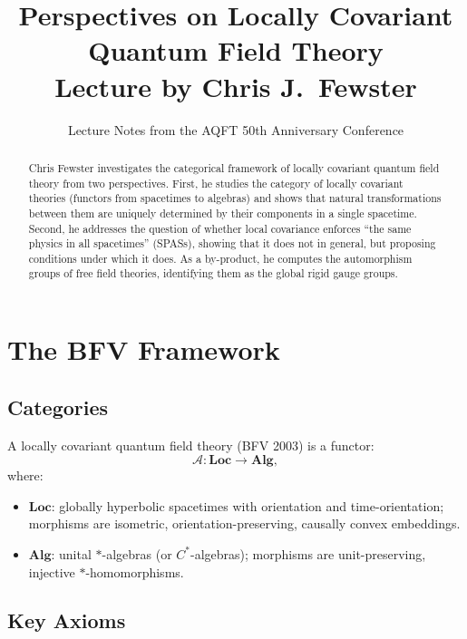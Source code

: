\documentclass[11pt,a4paper]{article}
\title{\textbf{Perspectives on Locally Covariant\\Quantum Field Theory}\\[6pt]
\large Lecture by Chris J.\ Fewster}
\author{Lecture Notes from the AQFT 50th Anniversary Conference}
\date{}
\begin{document}
\maketitle

\begin{abstract}
Chris Fewster investigates the categorical framework of locally covariant quantum
field theory from two perspectives. First, he studies the category of locally
covariant theories (functors from spacetimes to algebras) and shows that natural
transformations between them are uniquely determined by their components in a
single spacetime. Second, he addresses the question of whether local covariance
enforces ``the same physics in all spacetimes'' (SPASs), showing that it does not
in general, but proposing conditions under which it does. As a by-product, he
computes the automorphism groups of free field theories, identifying them as
the global rigid gauge groups.
\end{abstract}

\tableofcontents

\section{The BFV Framework}

\subsection{Categories}

A locally covariant quantum field theory (BFV 2003) is a functor:
\begin{equation}
  \mathscr{A}: \mathbf{Loc} \longrightarrow \mathbf{Alg},
\end{equation}
where:
\begin{itemize}[nosep]
  \item $\mathbf{Loc}$: globally hyperbolic spacetimes with orientation and
        time-orientation; morphisms are isometric, orientation-preserving,
        causally convex embeddings.
  \item $\mathbf{Alg}$: unital $*$-algebras (or $C^*$-algebras); morphisms
        are unit-preserving, injective $*$-homomorphisms.
\end{itemize}

\subsection{Key Axioms}
\end{document}
